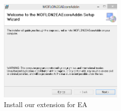 \begin{enumerate}
\begin{figure}[htbp]
	\centering
  \includegraphics[width=0.55\textwidth]{../installation_images/eaplugin_install.png}
	\caption{Install our extension for EA}
	\label{fig_eaPluginWizard}
\end{figure}
\end{enumerate}
 

